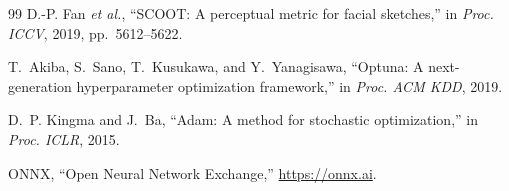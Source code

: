 \documentclass[journal]{IEEEtran}
\begin{document}
\begin{thebibliography}{99}
D.-P. Fan \emph{et al.}, ``SCOOT: A perceptual metric for facial sketches,'' in \emph{Proc. ICCV}, 2019, pp.~5612--5622.

T.~Akiba, S.~Sano, T.~Kusukawa, and Y.~Yanagisawa, ``Optuna: A next-generation hyperparameter optimization framework,'' in \emph{Proc. ACM KDD}, 2019.

D.~P. Kingma and J.~Ba, ``Adam: A method for stochastic optimization,'' in \emph{Proc. ICLR}, 2015.

ONNX, ``Open Neural Network Exchange,'' \url{https://onnx.ai}.

\end{thebibliography}
\end{document}
